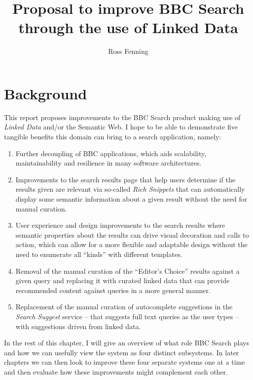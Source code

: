 \documentclass[10pt,a4paper]{report}
\title{Proposal to improve BBC Search through the use of Linked Data}
\author{Ross Fenning}
\begin{document}
\maketitle

\chapter{Background}

This report proposes improvements to the BBC Search product making use
of \emph{Linked Data}\cite{bizer2009linked} and/or the Semantic
Web\cite{berners2001semantic}. I hope to be able to demonstrate five tangible
benefits this domain can bring to a search application, namely:

\begin{enumerate}
  \item Further decoupling of BBC applications, which aids scalability,
    maintainability and resilience in many software architectures.\cite{}
  \item Improvements to the search results page that help users determine
    if the results given are relevant via so-called
    \emph{Rich Snippets}\cite{goel2009introducing}
    that can automatically display some semantic information about a given
    result without the need for manual curation.
  \item User experience and design improvements to the search results
    where semantic properties about the results can drive visual decoration
    and calls to action, which can allow for a more flexible and
    adaptable design without the need to enumerate all ``kinds'' with
    different templates.
  \item Removal of the manual curation of the ``Editor's Choice'' results
    against a given query and replacing it with curated linked data that
    can provide recommended content against queries in a more general
    manner.
  \item Replacement of the manual curation of autocomplete suggestions
    in the \emph{Search Suggest} service -- that suggests full text queries
    as the user types -- with suggestions driven from linked data.
\end{enumerate}

In the rest of this chapter, I will give an overview of what role BBC
Search plays and how we can usefully view the system as four
distinct subsystems. In later chapters we can then look to improve these
four separate systems one at a time and then evaluate how these improvements
might complement each other.
\end{document}
